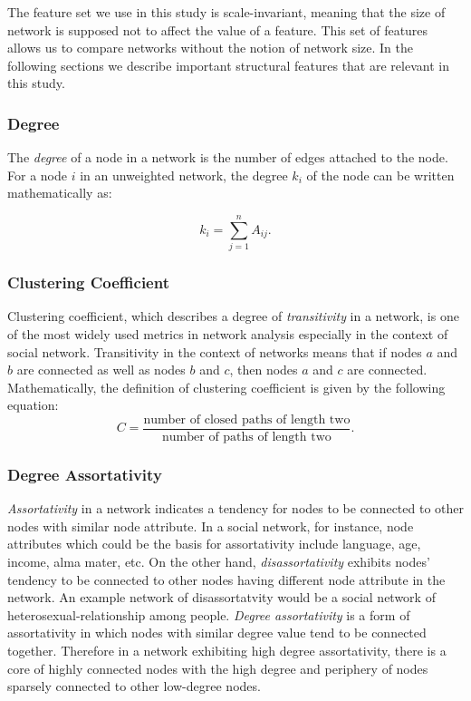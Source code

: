 \documentclass{article}
\begin{document}
	The feature set we use in this study is scale-invariant, meaning that the size of network is supposed not to affect the value of a feature. This set of features allows us to compare networks without the notion of network size. In the following sections we describe important structural features that are relevant in this study.	
	 
	\subsubsection{Degree}
	The \textit{degree} of a node in a network is the number of edges attached to the node. For a node $i$ in an unweighted network, the degree $k_i$ of the node can be written mathematically as:
	
	\begin{equation}
 	 k_i = \sum_{j = 1}^n A_{ij}.
	\end{equation}

	
	\subsubsection{Clustering Coefficient}
	Clustering coefficient, which describes a degree of \textit{transitivity} in a network, is one of the most widely used metrics in network analysis especially in the context of social network. Transitivity in the context of networks means that if nodes $a$ and $b$ are connected as well as nodes $b$ and $c$, then nodes $a$ and $c$ are connected. Mathematically, the definition of clustering coefficient is given by the following equation:
	\begin{equation}
	C = \frac{\text{number of closed paths of length two}}{\text{number of paths of length two}}.
	\end{equation}
	
	\subsubsection{Degree Assortativity}
	\textit{Assortativity} in a network indicates a tendency for nodes to be connected to other nodes with similar node attribute. In a social network, for instance, node attributes which could be the basis for assortativity include language, age, income, alma mater, etc. On the other hand, \textit{disassortativity} exhibits nodes' tendency to be connected to other nodes having different node attribute in the network. An example network of disassortatvity would be a social network of heterosexual-relationship among people. 
	\textit{Degree assortativity} is a form of assortativity in which nodes with similar degree value tend to be connected together. Therefore in a network exhibiting high degree assortativity, there is a core of highly connected nodes with the high degree and periphery of nodes sparsely connected to other low-degree nodes.
	
\end{document}
